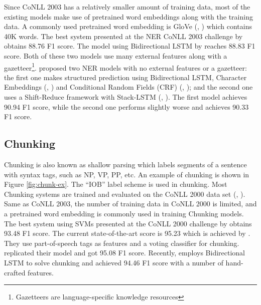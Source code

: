 \noindent
Since CoNLL 2003 has a relatively smaller amount of training data, most of the existing models make use of pretrained word embeddings along with the training data. A commonly used pretrained word embedding is GloVe (\citeauthor{pennington2014glove}, \citeyear{pennington2014glove}) which contains 40K words. The best system presented at the NER CoNLL 2003 challenge by \cite{florian2003named} obtains 88.76 F1 score. The model using Bidirectional LSTM by \cite{huang2015bidirectional} reaches 88.83 F1 score. Both of these two models use many external features along with a gazetteer\footnote{Gazetteers are language-specific knowledge resources}. \cite{lample2016neural} proposed two NER models with no external features or a gazetteer: the first one makes structured prediction using Bidirectional LSTM, Character Embeddings (\citeauthor{ling2015finding}, \citeyear{ling2015finding}) and Conditional Random Fields (CRF) (\citeauthor{lafferty2001conditional}, \citeyear{lafferty2001conditional}); and the second one uses a Shift-Reduce framework with Stack-LSTM (\citeauthor{dyer2015transition}, \citeyear{dyer2015transition}). The first model achieves 90.94 F1 score, while the second one performs slightly worse and achieves 90.33 F1 score. 

\subsection{Chunking}

Chunking is also known as shallow parsing which labels segments of a sentence with syntax tags, such as NP, VP, PP, etc.  An example of chunking is shown in Figure \ref{fig:chunk-ex}. The ``IOB'' label scheme is used in chunking. Most Chunking systems are trained and evaluated on the CoNLL 2000 data set (\citeauthor{tjong2000introduction}, \citeyear{tjong2000introduction}). Same as CoNLL 2003, the number of training data in CoNLL 2000 is limited, and a pretrained word embedding is commonly used in training Chunking models. The best system using SVMs presented at the CoNLL 2000 challenge by \cite{Kudoh:2000:USV:1117601.1117635} obtains 93.48 F1 score. The current state-of-the-art score is 95.23 which is achieved by \cite{shen2005voting}. They use part-of-speech tags as features and a voting classifier for chunking.  \cite{gut-besser-chunker} replicated their model and got 95.08 F1 score. Recently, \cite{huang2015bidirectional} employs Bidirectional LSTM to solve chunking and achieved 94.46 F1 score with a number of hand-crafted features.

